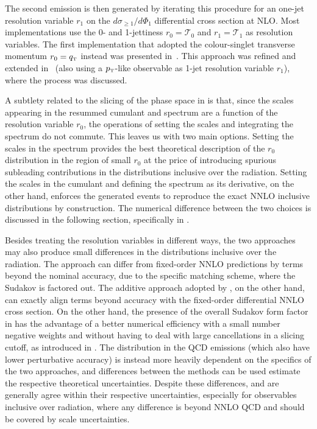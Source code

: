 \documentclass[11pt,a4paper]{article}
\begin{document}
The second emission is then generated by iterating this procedure 
for an one-jet resolution variable $r_1$ on
the $d\sigma_{\geq 1} / d\Phi_1$ differential cross section at NLO. Most
\GENEVA{} implementations use the 0- and 1-jettiness $r_0=\mathcal{T}_0$
and $r_1=\mathcal{T}_1$ as resolution variables. The first implementation
that adopted the colour-singlet transverse momentum
$r_0=q_{\scriptscriptstyle\rm T}$ instead was presented
in~. This approach was refined and extended
in~ (also using a $p_{\scriptscriptstyle\rm
  T}$-like observable as 1-jet resolution variable $r_1$), where the \bbtoH{} process was discussed.

A subtlety related to the slicing of the phase space in \GENEVA{} is
that, since the scales appearing in the resummed cumulant and spectrum
are a function of the resolution variable $r_0$, the operations of
setting the scales and integrating the spectrum do not commute. This
leaves us with two main options. Setting the scales in the spectrum
provides the best theoretical description of the $r_0$ distribution in
the region of small $r_0$ at the price of introducing spurious
subleading contributions in the distributions inclusive over the
radiation. Setting the scales in the cumulant and defining the
spectrum as its derivative, on the other hand, enforces the generated
events to reproduce the exact NNLO inclusive distributions by
construction. The numerical difference between the two choices is discussed in the following section, specifically in .

Besides treating the resolution variables in different ways, the two
approaches may also produce small differences in the distributions
inclusive over the radiation. The \minnlo{} approach can differ from 
fixed-order NNLO predictions by terms beyond the nominal accuracy,
due to the specific matching scheme, where the Sudakov is factored out.
 The additive approach
adopted by \GENEVA{}, on the other hand, can exactly align 
terms beyond accuracy with the fixed-order differential NNLO cross section.
On the other hand, the presence of the overall Sudakov form factor in
\minnlo{} has the advantage of a better numerical efficiency with a small number 
negative weights and without having to deal with large cancellations in a
slicing cutoff, as introduced in \GENEVA{}. The distribution in the QCD emissions 
(which also have lower perturbative accuracy) is instead more heavily
dependent on the specifics of the two approaches, and differences between
the methods can be used estimate the respective theoretical
uncertainties. Despite these differences, \minnlo{} and \GENEVA{} are generally 
agree within their respective uncertainties, especially for observables inclusive 
over radiation, where any difference is beyond NNLO QCD and should be 
covered by scale uncertainties.
\end{document}
